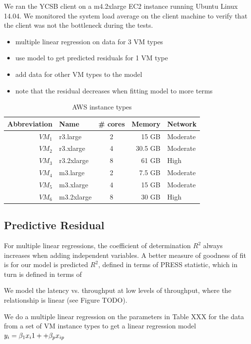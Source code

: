 \documentclass{acm_proc_article-sp}
\begin{document}
We ran the YCSB client on a m4.2xlarge EC2 instance running Ubuntu Linux 14.04. We monitored the system load average on the client machine to verify that the client was not the bottleneck during the tests.

\begin{itemize}
\item multiple linear regression on data for 3 VM types
\item use model to get predicted residuals for 1 VM type
\item add data for other VM types to the model
\item note that the residual decreases when fitting model to more terms
\end{itemize}

\begin{table}
\centering
\caption{AWS instance types}
\begin{tabular}{|r|l|c|r|l|} \hline
Abbreviation&Name& \# cores&Memory&Network\\ \hline
$VM_1$ & r3.large & 2 & 15 GB & Moderate\\ \hline
$VM_2$ & r3.xlarge & 4 & 30.5 GB & Moderate\\ \hline
$VM_3$ & r3.2xlarge & 8 & 61 GB & High\\ \hline
$VM_4$ & m3.large & 2 & 7.5 GB & Moderate\\ \hline
$VM_5$ & m3.xlarge & 4 & 15 GB & Moderate\\ \hline
$VM_6$ & m3.2xlarge & 8 & 30 GB & High\\ \hline
\hline\end{tabular}
\label{table:rdstypes}
\end{table}

\subsection{Predictive Residual}

For multiple linear regressions, the coefficient of determination $R^2$ always increases when adding independent variables.  A better measure of goodness of fit is for our model is predicted $R^2$, defined in terms of PRESS statistic, which in turn is defined in terms of 

We model the latency vs. throughput at low levels of throughput, where the relationship is linear (see Figure TODO).

We do a multiple linear regression on the parameters in Table XXX for the data from a set of VM instance types to get a linear regression model $y_i = \beta_1 x_i1+\dotfill+\beta_{p}x_{ip}$
\end{document}
